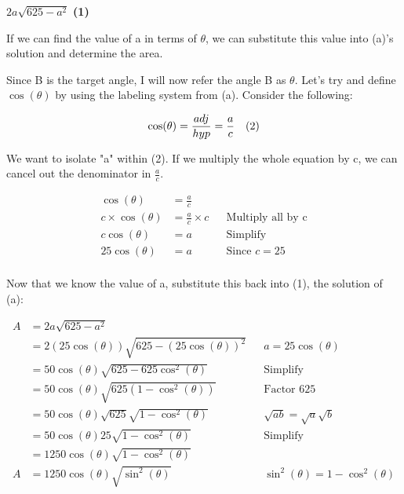 \documentclass[12pt]{book}
\begin{document}
\begin{enumerate}
\begin{center}
    $2a\sqrt{625 - a^2}$ \textbf{(1)} 
\end{center}

\vspace{0.2cm}
If we can find the value of a in terms of $\theta$, 
we can substitute this value into (a)'s solution and determine the area.

\vspace{0.3cm}
Since B is the target angle, I will now refer the angle B as $\theta$. 
Let's try and define $\cos(\theta)$ by using the labeling system from (a). 
Consider the following:

$$\cos(\theta) = \frac{adj}{hyp} = \frac{a}{c} \text{\space \space \space (2)}$$

We want to isolate "a" within (2). If we multiply the whole equation by c, we can 
cancel out the denominator in $\frac{a}{c}$.

\begin{align*}
    \cos(\theta) &= \frac{a}{c} \\
    c \times \cos(\theta) &= \frac{a}{c} \times c && \text{Multiply all by c}\\
    c\cos(\theta) &= a && \text{Simplify}\\
    25\cos(\theta) &= a && \text{Since } c = 25\\
\end{align*}

\newpage

\begin{center}
    Now that we know the value of a, substitute this back into (1), the solution of (a):
\end{center}
\vspace{-0.5cm}

\begin{align*}
    A &= 2a\sqrt{625 - a^2} \\
    &= 2(25\cos(\theta))\sqrt{625 - (25\cos(\theta))^2} && a=25\cos(\theta)\\
    &= 50\cos(\theta)\sqrt{625 - 625\cos^2(\theta)} && \text{Simplify}\\
    &= 50\cos(\theta)\sqrt{625(1 - \cos^2(\theta))} && \text{Factor 625}\\
    &= 50\cos(\theta)\sqrt{625} \sqrt{1 - \cos^2(\theta)} && \sqrt{ab} = \sqrt{a}\sqrt{b}\\ %
    &= 50\cos(\theta)25 \sqrt{1 - \cos^2(\theta)} && \text{Simplify} \\
    &= 1250\cos(\theta)\sqrt{1 - \cos^2(\theta)} \\
    A &= 1250\cos(\theta)\sqrt{\sin^2(\theta)} && \sin^2(\theta) = 1 - \cos^2(\theta)\\
\end{align*}


\end{enumerate}
\end{document}
